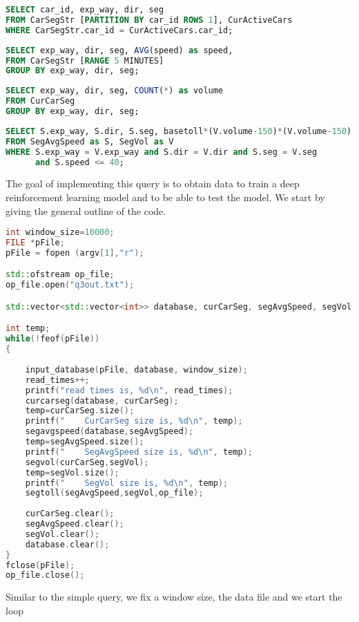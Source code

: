 \begin{lstlisting}[language=SQL]
SELECT car_id, exp_way, dir, seg
FROM CarSegStr [PARTITION BY car_id ROWS 1], CurActiveCars
WHERE CarSegStr.car_id = CurActiveCars.car_id;
\end{lstlisting}

\begin{lstlisting}[language=SQL]
SELECT exp_way, dir, seg, AVG(speed) as speed,
FROM CarSegStr [RANGE 5 MINUTES]
GROUP BY exp_way, dir, seg;
\end{lstlisting}
\begin{lstlisting}[language=SQL]
SELECT exp_way, dir, seg, COUNT(*) as volume
FROM CurCarSeg
GROUP BY exp_way, dir, seg;
\end{lstlisting}
\begin{lstlisting}[language=SQL]
SELECT S.exp_way, S.dir, S.seg, basetoll*(V.volume-150)*(V.volume-150)
FROM SegAvgSpeed as S, SegVol as V
WHERE S.exp_way = V.exp_way and S.dir = V.dir and S.seg = V.seg
      and S.speed <= 40;
\end{lstlisting}
The goal of implementing this query is to obtain data to train a deep reinforcement learning model and to be able to test the model. We start by giving the general outline of the code. \\
\begin{lstlisting}[language=C++]
int window_size=10000;
FILE *pFile;
pFile = fopen (argv[1],"r");

std::ofstream op_file;
op_file.open("q3out.txt");

std::vector<std::vector<int>> database, curCarSeg, segAvgSpeed, segVol;

int temp;
while(!feof(pFile))
{
    
    input_database(pFile, database, window_size);
    read_times++;
    printf("read times is, %d\n", read_times);
    curcarseg(database, curCarSeg);
    temp=curCarSeg.size();
    printf("    CurCarSeg size is, %d\n", temp);
    segavgspeed(database,segAvgSpeed);
    temp=segAvgSpeed.size();
    printf("    SegAvgSpeed size is, %d\n", temp);
    segvol(curCarSeg,segVol);
    temp=segVol.size();
    printf("    SegVol size is, %d\n", temp);
    segtoll(segAvgSpeed,segVol,op_file);
    
    curCarSeg.clear();
    segAvgSpeed.clear();
    segVol.clear();
    database.clear();
}
fclose(pFile);
op_file.close();
\end{lstlisting}
Similar to the simple query, we fix a window size, the data file and we start the loop\\
